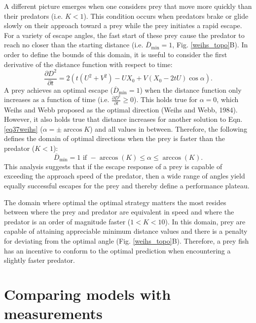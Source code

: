 \documentclass[12pt]{article}
\def\d{\partial}
\newcommand{\ol}{\overline}
\begin{document}
A different picture emerges when one considers prey that move more quickly than their predators (i.e. $K<1$). This condition occurs when predators brake or glide slowly on their approach toward a prey \citep{Higham:2007go, Higham:2005iu} while the prey initiates a rapid escape. For a variety of escape angles, the fast start of these prey cause the predator to reach no closer than the starting distance (i.e. $\ol D_{\text{min}}=1$, Fig. \ref{weihs_topo}B). In order to define the bounds of this domain, it is useful to consider the first derivative of the distance function with respect to time:
%
\begin{equation}
\frac{\d D^2}{\d t}= 2(t(U^2+V^2) - UX_0 + V(X_0-2tU)\cos\alpha).
\label{distderivative}
\end{equation}  
%
A prey achieves an optimal escape ($\ol D_{\text{min}}=1$) when the distance function only increases as a function of time (i.e. $\frac{\d D^2}{\d t}\geq0$). This holds true for $\alpha=0$, which Weihs and Webb proposed as the optimal direction (Weihs and Webb, 1984). However, it also holds true that distance increases for another solution to Eqn. \ref{eq37weihs} ($\alpha= \pm \arccos K$) and all values in between. Therefore, the following defines the domain of optimal directions when the prey is faster than the predator ($K<1$):
%
\begin{equation}
\ol D_{\text{min}}=1 \text{ if } -\arccos(K) \leq \alpha \leq \arccos(K).
\label{anglerange}
\end{equation}
%
This analysis suggests that if the escape response of a prey is capable of exceeding the approach speed of the predator, then a wide range of angles yield equally successful escapes for the prey and thereby define a performance plateau. 

The domain where optimal the optimal strategy matters the most resides between where the prey and predator are equivalent in speed and where the predator is an order of magnitude faster ($1<K<10$). In this domain, prey are capable of attaining appreciable minimum distance values and there is a penalty for deviating from the optimal angle (Fig. \ref{weihs_topo}B). Therefore, a prey fish has an incentive to conform to the optimal prediction when encountering a slightly faster predator.

\section{Comparing models with measurements}
\end{document}
